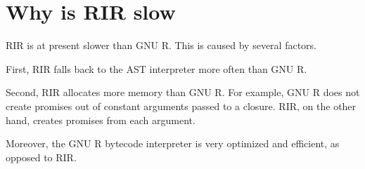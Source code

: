 \section{Why is RIR slow}

RIR is at present slower than GNU R. This is caused by several factors.

First, RIR falls back to the AST interpreter more often than GNU R.

Second, RIR allocates more memory than GNU R. For example, GNU R does not create promises out of constant arguments passed to a closure. RIR, on the other hand, creates promises from each argument.

Moreover, the GNU R bytecode interpreter is very optimized and efficient, as opposed to RIR.

